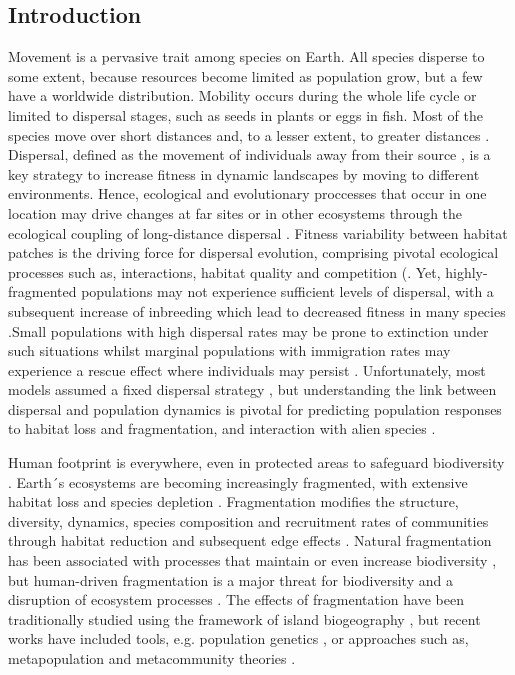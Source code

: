 \documentclass[12pt]{article}
\begin{document}
\begin{flushleft}
{{{{{\section{Introduction}
Movement is a pervasive trait among species on Earth. All species disperse to some extent, because resources become limited as population grow, but a few have a worldwide distribution. Mobility occurs during the whole life cycle or limited to dispersal stages, such as seeds in plants or eggs in fish. Most of the species move over short distances and, to a lesser extent, to greater distances \citep{davidson2004quantifying}. Dispersal, defined as the movement of individuals away from their source \citep{nathan2003methods}, is a key strategy to increase fitness in dynamic landscapes by moving to different environments. Hence, ecological and evolutionary proccesses that occur in one location may drive changes at far sites or in other ecosystems through the ecological coupling of long-distance dispersal \citep{gaines2007connecting}. Fitness variability between habitat patches is the driving force for dispersal evolution, comprising pivotal ecological processes such as, interactions, habitat quality and competition (\citep{bowler2005causes}. Yet, highly-fragmented populations may not experience sufficient levels of dispersal, with a subsequent increase of inbreeding which lead to decreased fitness in many species \citep{fath2018encyclopedia}.Small populations with high dispersal rates may be prone to extinction under such situations  whilst marginal populations with immigration rates may experience a rescue effect where individuals may persist \citep{eriksson2014emergence}. Unfortunately, most models assumed a fixed dispersal strategy \citep{mccallum2001should, levin2003ecology}, but understanding the link between dispersal and population dynamics is pivotal for predicting population responses to habitat loss and fragmentation, and interaction with alien species \citep{bowler2005causes}.

Human footprint is everywhere, even in protected areas to safeguard biodiversity \citep{ tournadre2014anthropogenic, jones2018one}. Earth´s ecosystems are becoming increasingly fragmented, with extensive habitat loss and species depletion \citep{haddad2015habitat}. Fragmentation modifies the structure, diversity, dynamics, species composition and recruitment rates of communities through habitat reduction and subsequent edge effects \citep{laurance1998effects, short2011extinction}. Natural fragmentation has been associated with processes that maintain or even increase biodiversity \citep{tilman1988plant}, but human-driven fragmentation is a major threat for biodiversity \citep{pimm2000biodiversity} and a disruption of ecosystem processes \citep{achard2002determination}. The effects of fragmentation have been traditionally studied using the framework of island biogeography \citep{whittaker2007island}, but recent works have included tools, e.g. population genetics \citep{young1996population}, or approaches such as, metapopulation \citep{hanski2004ecology} and metacommunity theories \citep{mouquet2011extinction}.

}}}}}
\end{flushleft}
\end{document}
